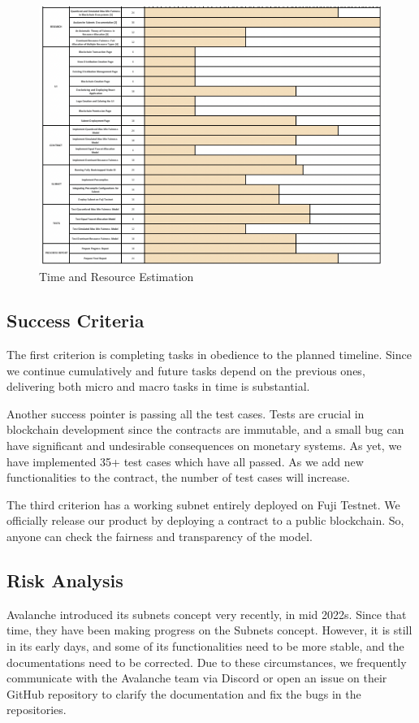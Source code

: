 \documentclass[a4paper,12pt]{report}
\begin{document}
\begin{figure}[H]
	\centering
	\includegraphics[width=1\textwidth]{time.png}
	\caption{Time and Resource Estimation}
\end{figure}
\subsection{Success Criteria}
The first criterion is completing tasks in obedience to the planned timeline. Since we continue cumulatively and future tasks depend on the previous ones, delivering both micro and macro tasks in time is substantial. 

Another success pointer is passing all the test cases. Tests are crucial in blockchain development since the contracts are immutable, and a small bug can have significant and undesirable consequences on monetary systems. As yet, we have implemented 35+ test cases which have all passed. As we add new functionalities to the contract, the number of test cases will increase.

The third criterion has a working subnet entirely deployed on Fuji Testnet. We officially release our product by deploying a contract to a public blockchain. So, anyone can check the fairness and transparency of the model.

\subsection{Risk Analysis}
Avalanche introduced its subnets concept very recently, in mid 2022s. Since that time, they have been making progress on the Subnets concept. However, it is still in its early days, and some of its functionalities need to be more stable, and the documentations need to be corrected.
Due to these circumstances, we frequently communicate with the Avalanche team via Discord or open an issue on their GitHub repository to clarify the documentation and fix the bugs in the repositories.
\end{document}
